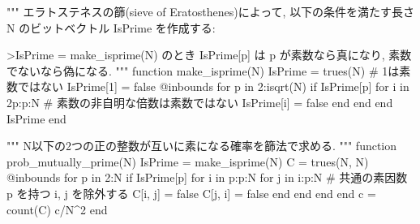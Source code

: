 \documentclass[
  letterpaper,
  DIV=11,
  numbers=noendperiod]{scrartcl}
\newenvironment{Shaded}{\begin{snugshade}}{\end{snugshade}}
\newcommand{\CommentTok}[1]{\textcolor[rgb]{0.37,0.37,0.37}{#1}}
\newcommand{\ConstantTok}[1]{\textcolor[rgb]{0.56,0.35,0.01}{#1}}
\newcommand{\ControlFlowTok}[1]{\textcolor[rgb]{0.00,0.23,0.31}{#1}}
\newcommand{\FloatTok}[1]{\textcolor[rgb]{0.68,0.00,0.00}{#1}}
\newcommand{\FunctionTok}[1]{\textcolor[rgb]{0.28,0.35,0.67}{#1}}
\newcommand{\KeywordTok}[1]{\textcolor[rgb]{0.00,0.23,0.31}{#1}}
\newcommand{\NormalTok}[1]{\textcolor[rgb]{0.00,0.23,0.31}{#1}}
\newcommand{\OperatorTok}[1]{\textcolor[rgb]{0.37,0.37,0.37}{#1}}
\newcommand{\PreprocessorTok}[1]{\textcolor[rgb]{0.68,0.00,0.00}{#1}}
\newcommand{\StringTok}[1]{\textcolor[rgb]{0.13,0.47,0.30}{#1}}
\begin{document}
\begin{Shaded}
\begin{Highlighting}[]
\StringTok{"""}
\StringTok{エラトステネスの篩(sieve of Eratosthenes)によって,}
\StringTok{以下の条件を満たす長さ \textasciigrave{}N\textasciigrave{} のビットベクトル \textasciigrave{}IsPrime\textasciigrave{} を作成する:}

\StringTok{\textgreater{}\textasciigrave{}IsPrime = make\_isprime(N)\textasciigrave{} のとき \textasciigrave{}IsPrime[p]\textasciigrave{} は \textasciigrave{}p\textasciigrave{} が素数なら真になり, 素数でないなら偽になる.}
\StringTok{"""}
\KeywordTok{function} \FunctionTok{make\_isprime}\NormalTok{(N)}
\NormalTok{    IsPrime }\OperatorTok{=} \FunctionTok{trues}\NormalTok{(N)}
    \CommentTok{\# 1は素数ではない}
\NormalTok{    IsPrime[}\FloatTok{1}\NormalTok{] }\OperatorTok{=} \ConstantTok{false}
    \PreprocessorTok{@inbounds} \ControlFlowTok{for}\NormalTok{ p }\KeywordTok{in} \FloatTok{2}\OperatorTok{:}\FunctionTok{isqrt}\NormalTok{(N)}
        \ControlFlowTok{if}\NormalTok{ IsPrime[p]}
            \ControlFlowTok{for}\NormalTok{ i }\KeywordTok{in} \FloatTok{2}\NormalTok{p}\OperatorTok{:}\NormalTok{p}\OperatorTok{:}\NormalTok{N}
                \CommentTok{\# 素数の非自明な倍数は素数ではない}
\NormalTok{                IsPrime[i] }\OperatorTok{=} \ConstantTok{false}
            \ControlFlowTok{end}
        \ControlFlowTok{end}
    \ControlFlowTok{end}
\NormalTok{    IsPrime}
\KeywordTok{end}

\StringTok{"""}
\StringTok{N以下の2つの正の整数が互いに素になる確率を篩法で求める.}
\StringTok{"""}
\KeywordTok{function} \FunctionTok{prob\_mutually\_prime}\NormalTok{(N)}
\NormalTok{    IsPrime }\OperatorTok{=} \FunctionTok{make\_isprime}\NormalTok{(N)}
\NormalTok{    C }\OperatorTok{=} \FunctionTok{trues}\NormalTok{(N, N)}
    \PreprocessorTok{@inbounds} \ControlFlowTok{for}\NormalTok{ p }\KeywordTok{in} \FloatTok{2}\OperatorTok{:}\NormalTok{N}
        \ControlFlowTok{if}\NormalTok{ IsPrime[p]}
            \ControlFlowTok{for}\NormalTok{ i }\KeywordTok{in}\NormalTok{ p}\OperatorTok{:}\NormalTok{p}\OperatorTok{:}\NormalTok{N}
                \ControlFlowTok{for}\NormalTok{ j }\KeywordTok{in}\NormalTok{ i}\OperatorTok{:}\NormalTok{p}\OperatorTok{:}\NormalTok{N}
                    \CommentTok{\# 共通の素因数 p を持つ i, j を除外する}
\NormalTok{                    C[i, j] }\OperatorTok{=} \ConstantTok{false}
\NormalTok{                    C[j, i] }\OperatorTok{=} \ConstantTok{false}
                \ControlFlowTok{end}
            \ControlFlowTok{end}
        \ControlFlowTok{end}
    \ControlFlowTok{end}
\NormalTok{    c }\OperatorTok{=} \FunctionTok{count}\NormalTok{(C)}
\NormalTok{    c}\OperatorTok{/}\NormalTok{N}\OperatorTok{\^{}}\FloatTok{2}
\KeywordTok{end}
\end{Highlighting}
\end{Shaded}
\end{document}
